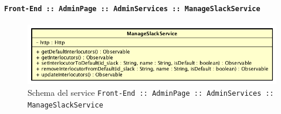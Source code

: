 \documentclass[../DefinizioneDiProdotto_v2.0.0.tex]{subfiles}
\begin{document}
     	 		\paragraph{\texttt{Front-End :: AdminPage :: AdminServices :: ManageSlackService}}
     	 		\acapo
				\begin{figure}[!h]
					\centering
					\includegraphics[scale=0.6]{Architettura/Front-End/AdminPage/AdminServices/ManageSlackService.png}
					\caption{Schema del service \texttt{Front-End :: AdminPage :: AdminServices :: ManageSlackService}}
				\end{figure}
\end{document}
